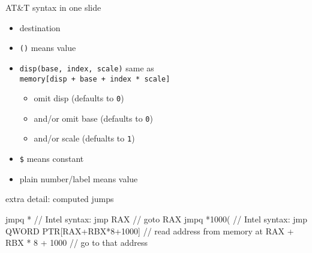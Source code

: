 \begin{frame}{AT\&T syntax in one slide}
    \begin{itemize}
    \item destination 
    \item {\tt ()} means value 
    \item {\tt disp(base, index, scale)} same as \\ {\tt memory[disp + base + index * scale]}
        \begin{itemize}
        \item omit disp (defaults to {\tt 0})
        \item and/or omit base (defaults to {\tt 0})
        \item and/or scale (defualts to {\tt 1})
        \end{itemize}
    \item {\tt \$} means constant
    \item plain number/label means value 
    \end{itemize}
\end{frame}

\begin{frame}[fragile,label=compJmpATT]{extra detail: computed jumps}
\begin{asmcodeNL}
jmpq *%
// Intel syntax: jmp RAX
    // goto RAX
jmpq *1000(%
// Intel syntax: jmp QWORD PTR[RAX+RBX*8+1000]
    // read address from memory at RAX + RBX * 8 + 1000
    // go to that address
\end{asmcodeNL}
\end{frame}

